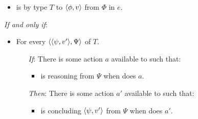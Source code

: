 \begin{note}
    \begin{definition}[\ptC{2}]
    \label{def:ptC}

    \noindent%

    \begin{itemize}
    \item
      \vAgent{} is \emph{} by type \(T\) to \(\langle \phi, v \rangle\) from \(\Phi\) in \(e\).
    \end{itemize}

    \emph{If and only if}:

    \begin{itemize}[noitemsep]
    \item
      For every \tI{} \(\langle \langle \psi, v' \rangle, \Psi \rangle\) of \(T\).
      \begin{itemize}[noitemsep]
      \item[\emph{If}:]
        There is some action \(a\) available to \vAgent{} such that:
        \begin{itemize}
        \item
          \vAgent{} is reasoning from \(\Psi\) when \vAgent{} does \(a\).
        \end{itemize}
      \item[\emph{Then}:]
        There is some action \(a'\) available to \vAgent{} such that:
        \begin{itemize}
        \item
          \vAgent{} is concluding \(\langle \psi, v' \rangle\) from \(\Psi\) when \vAgent{} does \(a'\).
        \end{itemize}
      \end{itemize}
    \end{itemize}
    \vspace{-\baselineskip}
  \end{definition}
\end{note}


